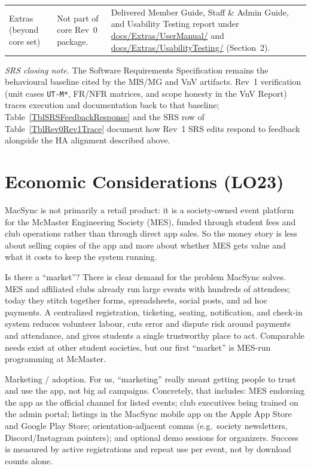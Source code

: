 \documentclass{article}
\begin{document}
\begin{longtable}{@{} p{2.35cm} p{4.55cm} p{6.1cm} @{}}
Extras (beyond core set) & Not part of core Rev~0 package. & Delivered Member Guide, Staff \& Admin Guide, and Usability Testing report under \url{docs/Extras/UserManual/} and \url{docs/Extras/UsabilityTesting/} (Section~2). \\

\end{longtable}

\noindent\textit{SRS closing note.} The Software Requirements Specification remains the behavioural baseline cited by the
MIS/MG and VnV artifacts. Rev~1 verification (unit cases \texttt{UT-M*}, FR/NFR matrices, and scope honesty in the VnV Report)
traces execution and documentation back to that baseline; Table~\ref{TblSRSFeedbackResponse} and the SRS row of
Table~\ref{TblRev0Rev1Trace} document how Rev~1 SRS edits respond to feedback alongside the HA alignment described above.

\section{Economic Considerations (LO23)}

MacSync is not primarily a retail product: it is a society-owned event
platform for the McMaster Engineering Society (MES), funded through student fees
and club operations rather than through direct app sales. So the money story is
less about selling copies of the app and more about whether MES gets
value and what it costs to keep the system running.

Is there a ``market''? There is clear demand for the problem
MacSync solves. MES and affiliated clubs already run large events with hundreds
of attendees; today they stitch together forms, spreadsheets, social posts, and
ad hoc payments. A centralized registration, ticketing, seating, notification,
and check-in system reduces volunteer labour, cuts error and dispute risk around
payments and attendance, and gives students a single trustworthy place to act.
Comparable needs exist at other student societies, but our first
``market'' is MES-run programming at McMaster.

Marketing / adoption. For us, ``marketing'' really meant getting
people to trust and use the app, not big ad campaigns. Concretely, that includes: MES
endorsing the app as the official channel for listed events; club executives
being trained on the admin portal; listings in the MacSync mobile app on the
Apple App Store and Google Play Store; orientation-adjacent comms (e.g.\
society newsletters, Discord/Instagram pointers); and optional demo sessions for
organizers. Success is measured by active registrations and repeat use
per event, not by download counts alone.
\end{document}
